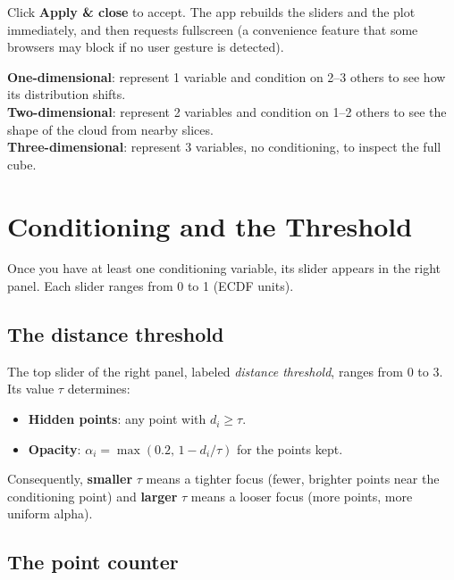 \documentclass[11pt,a4paper]{article}
\begin{document}
Click \textbf{Apply \& close} to accept. The app rebuilds the sliders and the plot immediately, and then requests fullscreen (a convenience feature that some browsers may block if no user gesture is detected).

\begin{tipbox}
\textbf{One-dimensional}: represent 1 variable and condition on 2--3 others to see how its distribution shifts. \\
\textbf{Two-dimensional}: represent 2 variables and condition on 1--2 others to see the shape of the cloud from nearby slices. \\
\textbf{Three-dimensional}: represent 3 variables, no conditioning, to inspect the full cube.
\end{tipbox}

\section{Conditioning and the Threshold}

Once you have at least one conditioning variable, its slider appears in the right panel. Each slider ranges from 0 to 1 (ECDF units).

\subsection{The distance threshold}

The top slider of the right panel, labeled \emph{distance threshold}, ranges from 0 to 3. Its value $\tau$ determines:

\begin{itemize}[leftmargin=1.4em]
  \item \textbf{Hidden points}: any point with $d_i \ge \tau$.
  \item \textbf{Opacity}: $\alpha_i = \max(0.2,\, 1 - d_i/\tau)$ for the points kept.
\end{itemize}

Consequently, \textbf{smaller} $\tau$ means a tighter focus (fewer, brighter points near the conditioning point) and \textbf{larger} $\tau$ means a looser focus (more points, more uniform alpha).

\subsection{The point counter}
\end{document}

